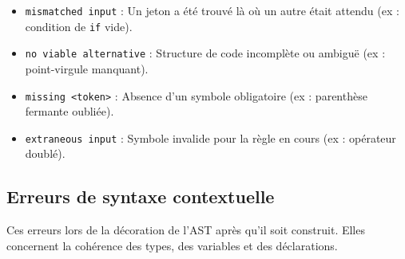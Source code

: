 \begin{itemize}[label=$\circ$]
    \item \texttt{mismatched input} : Un jeton a été trouvé là où un autre était attendu (ex : condition de \texttt{if} vide).
    
    \item \texttt{no viable alternative} : Structure de code incomplète ou ambiguë (ex : point-virgule manquant).
    
    \item \texttt{missing <token>} : Absence d'un symbole obligatoire (ex : parenthèse fermante oubliée).
    
    \item \texttt{extraneous input} : Symbole invalide pour la règle en cours (ex : opérateur doublé).
\end{itemize}


\subsection{Erreurs de syntaxe contextuelle}
\noindent
Ces erreurs lors de la décoration de l'AST après qu'il soit construit. Elles concernent la cohérence des types, des variables et des déclarations.

